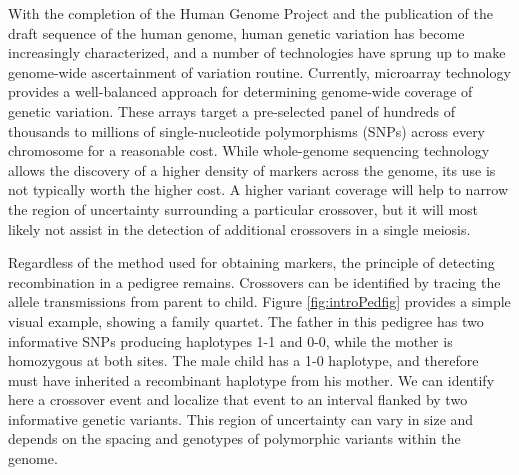 With the completion of the Human Genome Project and the publication of the draft sequence of the human genome\cite{Venter2001,Lander2001}, human genetic variation has become increasingly characterized, and a number of technologies have sprung up to make genome-wide ascertainment of variation routine.
Currently, microarray technology provides a well-balanced approach for determining genome-wide coverage of genetic variation.
These arrays target a pre-selected panel of hundreds of thousands to millions of single-nucleotide polymorphisms (SNPs) across every chromosome for a reasonable cost.
While whole-genome sequencing technology allows the discovery of a higher density of markers across the genome, its use is not typically worth the higher cost.
A higher variant coverage will help to narrow the region of uncertainty surrounding a particular crossover, but it will most likely not assist in the detection of additional crossovers in a single meiosis.

Regardless of the method used for obtaining markers, the principle of detecting recombination in a pedigree remains.
Crossovers can be identified by tracing the allele transmissions from parent to child.
Figure \ref{fig:introPedfig} provides a simple visual example, showing a family quartet.
The father in this pedigree has two informative SNPs producing haplotypes 1-1 and 0-0, while the mother is homozygous at both sites.
The male child has a 1-0 haplotype, and therefore must have inherited a recombinant haplotype from his mother.
We can identify here a crossover event and localize that event to an interval flanked by two informative genetic variants.
This region of uncertainty can vary in size and depends on the spacing and genotypes of polymorphic variants within the genome.

